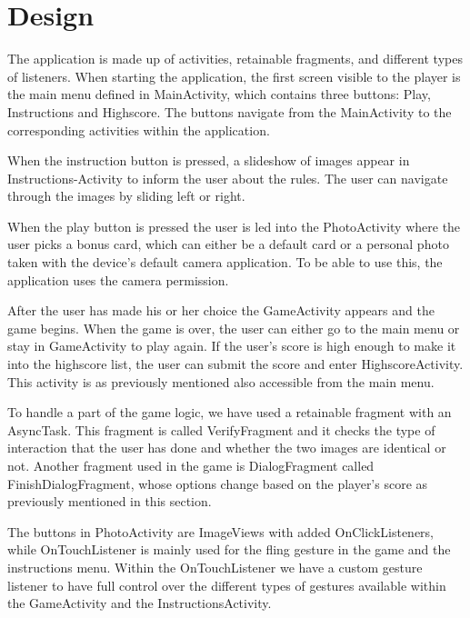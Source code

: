 \section{Design}
The application is made up of activities, retainable fragments, and different types of listeners. When starting the application, the first screen visible to the player is the main menu defined in MainActivity, which contains three buttons: Play, Instructions and Highscore. The buttons navigate from the MainActivity to the corresponding activities within the application. 

When the instruction button is pressed, a slideshow of images appear in Instructions-Activity to inform the user about the rules. The user can navigate through the images by sliding left or right. \newline

When the play button is pressed the user is led into the PhotoActivity where the user picks a bonus card, which can either be a default card or a personal photo taken with the device’s default camera application. To be able to use this, the application uses the camera permission. \newline

After the user has made his or her choice the GameActivity appears and the game begins. When the game is over, the user can either go to the main menu or stay in GameActivity to play again. If the user’s score is high enough to make it into the highscore list, the user can submit the score and enter HighscoreActivity. This activity is as previously mentioned also accessible from the main menu. \newline

To handle a part of the game logic, we have used a retainable fragment with an AsyncTask. This fragment is called VerifyFragment and it checks the type of interaction that the user has done and whether the two images are identical or not. Another fragment used in the game is DialogFragment called FinishDialogFragment, whose options change based on the player’s score as previously mentioned in this section. \newline

The buttons in PhotoActivity are ImageViews with added OnClickListeners, while OnTouchListener is mainly used for the fling gesture in the game and the instructions menu. Within the OnTouchListener we have a custom gesture listener to have full control over the different types of gestures available within the GameActivity and the InstructionsActivity.